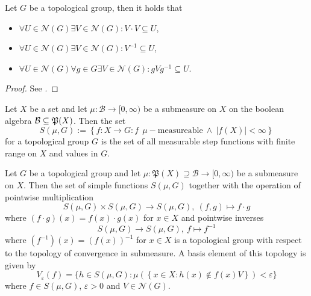 \begin{lemma}
  Let $G$ be a topological group, then it holds that
  \vspace*{-7px}
  \begin{itemize}
    \item $\forall U\in \mathcal{N}(G)\exists V\in\mathcal{N}(G)\colon V\cdot V \subseteq U$,
  \vspace*{-7px}
    \item $\forall U\in \mathcal{N}(G)\exists V\in\mathcal{N}(G)\colon V^{-1} \subseteq U$,
  \vspace*{-7px}
    \item $\forall U\in \mathcal{N}(G)\forall g\in G\exists V\in\mathcal{N}(G)\colon gVg^{-1} \subseteq U$.
  \end{itemize}
\end{lemma}

\begin{proof}
  See \cite[Satz 16.16]{BvQMT}.
\end{proof}

\begin{defin}\label{defin:sf}
  Let $X$ be a set and let $\mu\colon \mathcal{B} \to [0, \infty)$ be a submeasure on $X$ on the boolean algebra $\mathcal{B} \subseteq \mathfrak{P}(X)$. Then the set
  \begin{equation*}
    S(\mu, G) := \left\{ f: X \to G\colon f \:\:\mu-\text{measureable} \: \land \: \left| f(X) \right| < \infty \right\}
  \end{equation*}
  for a topological group $G$ is the set of all measurable step functions with finite range on $X$ and values in $G$.
\end{defin}

\begin{thm}\label{thm:stop}
  Let $G$ be a topological group and let $\mu\colon \mathfrak{P}(X) \supseteq \mathcal{B} \to [0,\infty)$ be a submeasure on $X$. Then the set of simple functions $S(\mu, G)$ together with the operation of pointwise multiplication \[S(\mu, G) \times S(\mu, G) \to S(\mu, G), \: (f, g) \mapsto f \cdot g\] where $(f \cdot g)(x) = f(x) \cdot g(x)$ for $x \in X$ and pointwise inverses \[S(\mu, G) \to S(\mu, G), \: f \mapsto f^{-1}\] where $(f^{-1})(x) = (f(x))^{-1}$ for $x \in X$ is a topological group with respect to the topology of convergence in submeasure. A basis element of this topology is given by \[V_\varepsilon(f) = \{h\in S(\mu, G)\colon \mu(\left\{x\in X\colon h(x)\notin f(x)V \right\}) < \varepsilon\} \] where $f\in S(\mu, G)$, $\varepsilon > 0$ and $V \in \mathcal{N}(G)$.
\end{thm}

